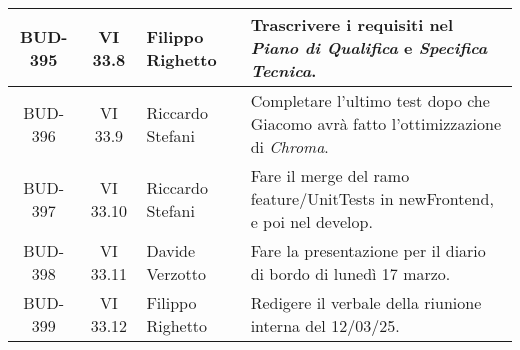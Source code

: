 \begin{table}[htbp]
\begin{tabular}{|c|c|p{}|p{}|}
    \hline
    BUD-395 & VI 33.8 & Filippo Righetto & Trascrivere i requisiti nel \emph{Piano di Qualifica} e \emph{Specifica Tecnica}. \\
    \hline
    BUD-396 & VI 33.9 & Riccardo Stefani & Completare l’ultimo test dopo che Giacomo avrà fatto l’ottimizzazione di \emph{Chroma}. \\
    \hline
    BUD-397 & VI 33.10 & Riccardo Stefani & Fare il merge del ramo feature/UnitTests in newFrontend, e poi nel develop. \\
    \hline
    BUD-398 & VI 33.11 & Davide Verzotto & Fare la presentazione per il diario di bordo di lunedì 17 marzo.  \\
    \hline
    BUD-399 & VI 33.12 & Filippo Righetto & Redigere il verbale della riunione interna del 12/03/25.  \\
    \hline
\end{tabular}
\end{table}

